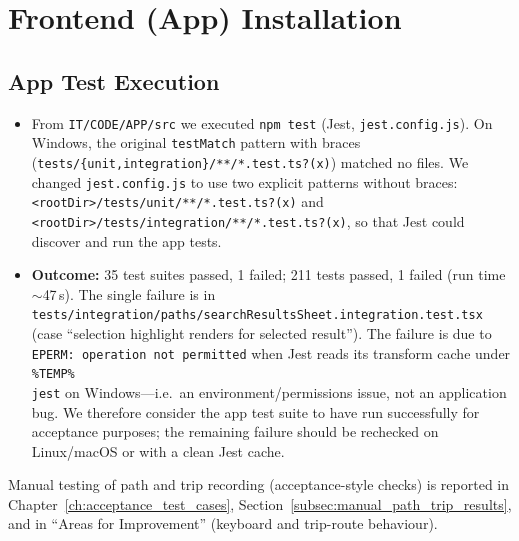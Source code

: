 \section{Frontend (App) Installation}
\label{sec:frontend_installation}

\subsection{App Test Execution}
\begin{itemize}
    \item From \texttt{IT/CODE/APP/src} we executed \texttt{npm test} (Jest, \texttt{jest.config.js}). On Windows, the original \texttt{testMatch} pattern with braces (\texttt{tests/\{unit,integration\}/**/*.test.ts?(x)}) matched no files. We changed \texttt{jest.config.js} to use two explicit patterns without braces:\\ \texttt{<rootDir>/tests/unit/**/*.test.ts?(x)} and \texttt{<rootDir>/tests/integration/**/*.test.ts?(x)}, so that Jest could discover and run the app tests.
    \item \textbf{Outcome:} 35 test suites passed, 1 failed; 211 tests passed, 1 failed (run time $\sim$47\,s). The single failure is in \texttt{tests/integration/paths/searchResultsSheet.integration.test.tsx} (case ``selection highlight renders for selected result''). The failure is due to \texttt{EPERM: operation not permitted} when Jest reads its transform cache under \texttt{\%TEMP\%\\jest} on Windows---i.e.\ an environment/permissions issue, not an application bug. We therefore consider the app test suite to have run successfully for acceptance purposes; the remaining failure should be rechecked on Linux/macOS or with a clean Jest cache.
\end{itemize}

Manual testing of path and trip recording (acceptance-style checks) is reported in Chapter~\ref{ch:acceptance_test_cases}, Section~\ref{subsec:manual_path_trip_results}, and in ``Areas for Improvement'' (keyboard and trip-route behaviour).

